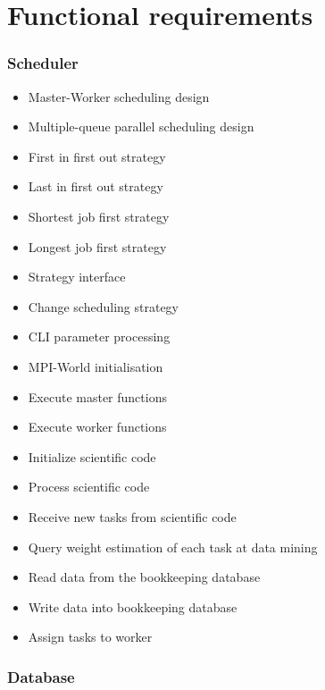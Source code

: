 {


\setcounter{func}{10}
\renewcommand{\labelitemi}{
	\ifnum \value{func}<10$/F 0\arabic{func} /$\addtocounter{func}{10}
	\else $/F \arabic{func} /$\addtocounter{func}{10}\fi
	}

\section{Functional requirements} 
	
	\subsubsection{Scheduler}
	
		\begin{itemize}
			\item Master-Worker scheduling design
			\item Multiple-queue parallel scheduling design
			\item First in first out strategy
			\item Last in first out strategy
			\item Shortest job first strategy
			\item Longest job first strategy 
			\item Strategy interface
			\item Change scheduling strategy
			\item CLI parameter processing
			\item MPI-World initialisation
			\item Execute master functions
			\item Execute worker functions
			\item Initialize scientific code
			\item Process scientific code 
			\item Receive new tasks from scientific code
			\item Query weight estimation of each task at data mining
			\item Read data from the bookkeeping database
			\item Write data into bookkeeping database
			\item Assign tasks to worker
		\end{itemize}
	
	\subsubsection{Database}
	
}
